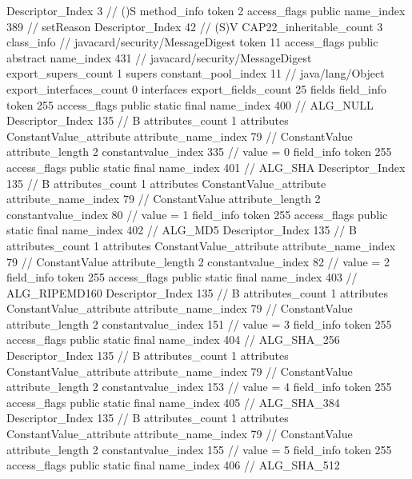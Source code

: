 {{{{{					Descriptor_Index	3		// ()S
				}
				method_info {
					token	2
					access_flags	public
					name_index	389		// setReason
					Descriptor_Index	42		// (S)V
				}
			}
			CAP22_inheritable_count	3
		}
		class_info {		// javacard/security/MessageDigest
			token	11
			access_flags	public abstract
			name_index	431		// javacard/security/MessageDigest
			export_supers_count	1
			supers {
				constant_pool_index	11		// java/lang/Object
			}
			export_interfaces_count	0
			interfaces {
			}
			export_fields_count	25
			fields {
			field_info {
				token	255
				access_flags	public static final
				name_index	400		// ALG_NULL
				Descriptor_Index	135		// B
				attributes_count	1
				attributes {
				ConstantValue_attribute {
					attribute_name_index	79		// ConstantValue
					attribute_length	2
					constantvalue_index	335		// value = 0
				}
				}
			}
			field_info {
				token	255
				access_flags	public static final
				name_index	401		// ALG_SHA
				Descriptor_Index	135		// B
				attributes_count	1
				attributes {
				ConstantValue_attribute {
					attribute_name_index	79		// ConstantValue
					attribute_length	2
					constantvalue_index	80		// value = 1
				}
				}
			}
			field_info {
				token	255
				access_flags	public static final
				name_index	402		// ALG_MD5
				Descriptor_Index	135		// B
				attributes_count	1
				attributes {
				ConstantValue_attribute {
					attribute_name_index	79		// ConstantValue
					attribute_length	2
					constantvalue_index	82		// value = 2
				}
				}
			}
			field_info {
				token	255
				access_flags	public static final
				name_index	403		// ALG_RIPEMD160
				Descriptor_Index	135		// B
				attributes_count	1
				attributes {
				ConstantValue_attribute {
					attribute_name_index	79		// ConstantValue
					attribute_length	2
					constantvalue_index	151		// value = 3
				}
				}
			}
			field_info {
				token	255
				access_flags	public static final
				name_index	404		// ALG_SHA_256
				Descriptor_Index	135		// B
				attributes_count	1
				attributes {
				ConstantValue_attribute {
					attribute_name_index	79		// ConstantValue
					attribute_length	2
					constantvalue_index	153		// value = 4
				}
				}
			}
			field_info {
				token	255
				access_flags	public static final
				name_index	405		// ALG_SHA_384
				Descriptor_Index	135		// B
				attributes_count	1
				attributes {
				ConstantValue_attribute {
					attribute_name_index	79		// ConstantValue
					attribute_length	2
					constantvalue_index	155		// value = 5
				}
				}
			}
			field_info {
				token	255
				access_flags	public static final
				name_index	406		// ALG_SHA_512
}}}}}
